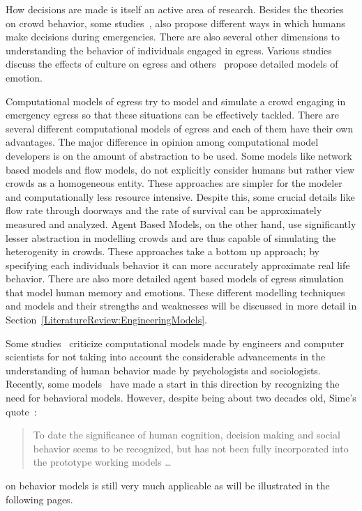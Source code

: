 How decisions are made is itself an active area of research. Besides the theories on crowd behavior, some studies~\cite{Pires:2005gs, Ozel:2001tn}, also propose different ways in which humans make decisions during emergencies. There are also several other dimensions to understanding the behavior of individuals engaged in egress. Various studies~\cite{Andree:2008td,Sandberg:1997tw,Kobes:2009jx} discuss the effects of culture on egress and others~\cite{Pelechano:2005vp,Aydt:2011wz} propose detailed models of emotion.

Computational models of egress try to model and simulate a crowd engaging in emergency egress so that these situations can be effectively tackled. There are several different computational models of egress and each of them have their own advantages. The major difference in opinion among computational model developers is on the amount of abstraction to be used. Some models like network based models and flow models, do not explicitly consider humans but rather view crowds as a homogeneous entity. These approaches are simpler for the modeler and computationally less resource intensive. Despite this, some crucial details like flow rate through doorways and the rate of survival can be approximately measured and analyzed. Agent Based Models, on the other hand, use significantly lesser abstraction in modelling crowds and are thus capable of simulating the heterogenity in crowds. These approaches take a bottom up approach; by specifying each individuals behavior it can more accurately approximate real life behavior. There are also more detailed agent based models of egress simulation that model human memory and emotions. These different modelling techniques and models and their strengths and weaknesses will be discussed in more detail in Section~\ref{LiteratureReview:EngineeringModels}.

Some studies~\cite{Torres:2010tj,Sime:1995uu,Aguirre:2004tn} criticize computational models made by engineers and computer scientists for not taking into account the considerable advancements in the understanding of human behavior made by psychologists and sociologists. Recently, some models~\cite{Pan:2006vp} have made a start in this direction by recognizing the need for behavioral models. However, despite being about two decades old, Sime's quote~\cite{Sime:1995uu}:
\begin{quote}
To date the significance of human cognition, decision making and social behavior seems to be recognized, but has not been fully incorporated into the prototype working models \ldots
\end{quote}
on behavior models is still very much applicable as will be illustrated in the following pages.

